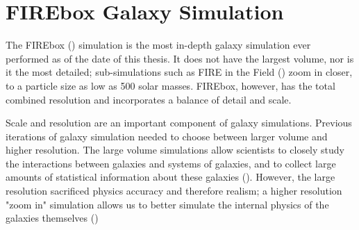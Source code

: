 \section{FIREbox Galaxy Simulation}
The FIREbox (\cite{feldmannFIREboxSimulatingGalaxies2022}) simulation is the most in-depth galaxy simulation ever performed as of the date of this thesis. It does not have the largest volume, nor is it the most detailed; sub-simulations such as FIRE in the Field (\cite{fittsFireFieldSimulating2017}) zoom in closer, to a particle size as low as 500 solar masses. FIREbox, however, has the total combined resolution and incorporates a balance of detail and scale.

Scale and resolution are an important component of galaxy simulations. Previous iterations of galaxy simulation needed to choose between larger volume and higher resolution. The large volume simulations allow scientists to closely study the interactions between galaxies and systems of galaxies, and to collect large amounts of statistical information about these galaxies (\cite{feldmannFIREboxSimulatingGalaxies2022}). However, the large resolution sacrificed physics accuracy and therefore realism; a higher resolution "zoom in" simulation allows us to better simulate the internal physics of the galaxies themselves (\cite{feldmannFIREboxSimulatingGalaxies2022})






